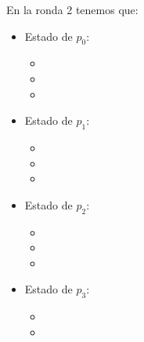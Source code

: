 En la ronda 2 tenemos que:
\begin{multicols}{2}
\begin{itemize}
\item Estado de $p_0$:
      \begin{itemize}
      \item {}
      
      \item {}
      
      \item {}
      \end{itemize}
      
\item Estado de $p_1$:
      \begin{itemize}
      \item {}
      
      \item {}
      
      \item {}
      \end{itemize}

\item Estado de $p_2$:
      \begin{itemize}
      \item {}
      
      \item {}
      
      \item {}
      \end{itemize}

\item Estado de $p_3$:
      \begin{itemize}
      \item {}
      
      \item {}
      

\end{itemize}
\end{itemize}
\end{multicols}
